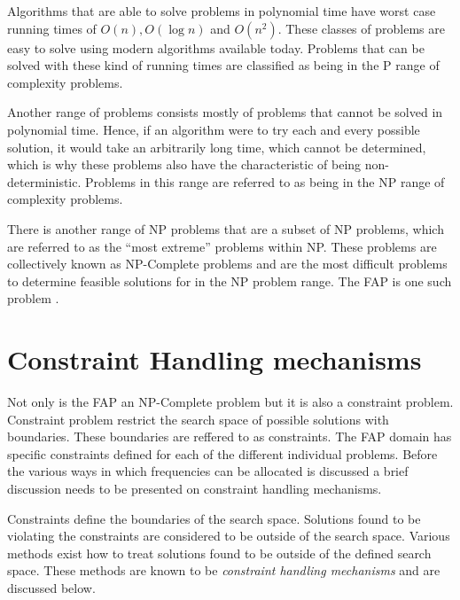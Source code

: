 Algorithms that are able to solve problems in polynomial time have worst case running times of $O(n),O(\log n)$ and $O(n^2)$\cite{AIModernApproach}. These classes of problems are easy to solve using modern algorithms available today. Problems that can be solved with these kind of running times are classified as being in the P range of complexity problems\cite{AIModernApproach}.

Another range of problems consists mostly of problems that cannot be solved in polynomial time\cite{AIModernApproach}. Hence, if an algorithm were to try each and every possible solution, it would take an arbitrarily long time, which cannot be determined, which is why these problems also have the characteristic of being non-deterministic\cite{AIModernApproach}. Problems in this range are referred to as being in the NP range of complexity problems\cite{AIModernApproach}.

There is another range of NP problems that are a subset of NP problems, which are referred to as the ``most extreme'' problems within NP\@.  These problems are collectively known as NP-Complete problems and are the most difficult problems to determine feasible solutions for in the NP problem range\cite{AIModernApproach}. The \gls{FAP} is one such problem \cite{AndreasPaper,FixedFAPPSO}.

\section{Constraint Handling mechanisms}
\label{sec:chm}
Not only is the \gls{FAP} an NP-Complete problem but it is also a constraint problem. Constraint problem restrict the search space of possible solutions with boundaries. These boundaries are reffered to as constraints. The \gls{FAP} domain has specific constraints defined for each of the different individual problems. Before the various ways in which frequencies can be allocated is discussed a brief discussion needs to be presented on constraint handling mechanisms.

Constraints define the boundaries of the search space. Solutions found to be violating the constraints are considered to be outside of the search space. Various methods exist how to treat solutions found to be outside of the defined search space. These methods are known to be \emph{constraint handling mechanisms} and are discussed below.

